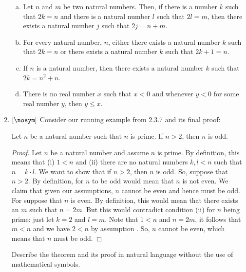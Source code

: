 \begin{enumerate}[{\thesection}.1]
	\begin{enumerate}[(a)]
	
		\item Let $n$ and $m$ be two natural numbers. Then, if there is a number $k$ such that $2k=n$ and there is a natural number $l$ such that $2l=m$, then there exists a natural number $j$ such that $2j=n+m$.
		
		\item For every natural number, $n$, either there exists a natural number $k$ such that $2k=n$ or there exists a natural number $k$ such that $2k+1=n$.
		
		\item If $n$ is a natural number, then there exists a natural number $k$ such that $2k=n^2+n$.
		
		\item There is no real number $x$ such that $x<0$ and whenever $y<0$ for some real number $y$, then $y\leq x$. 
					
	\end{enumerate}
	
	\item $[\nosym]$ Consider our running example from 2.3.7 and its final proof:
	
	\begin{proposition}
				Let $n$ be a natural number such that $n$ is prime. If $n>2$, then $n$ is odd.
				\end{proposition}
				
				\begin{proof}
		Let $n$ be a natural number and assume $n$ is prime. By definition, this means that (i) $1<n$ and (ii) there are no natural numbers $k,l<n$ such that $n=k\cdot l$. We want to show that if $n>2$, then $n$ is odd. So, suppose that $n>2$. By definition, for $n$ to be odd would mean that $n$ is not even. We claim that given our assumptions, $n$ cannot be even and hence must be odd. For suppose that $n$ is even. By definition, this would mean that there exists an $m$ such that $n=2m$. But this would contradict condition (ii) for $n$ being prime: just let $k=2$ and $l=m$. Note that $1<n$ and $n=2m$, it follows that $m<n$ and we have $2<n$ by assumption . So, $n$ cannot be even, which means that $n$ must be odd.
		\end{proof}
	
		Describe the theorem and its proof in natural language without the use of mathematical symbols.

\end{enumerate}

